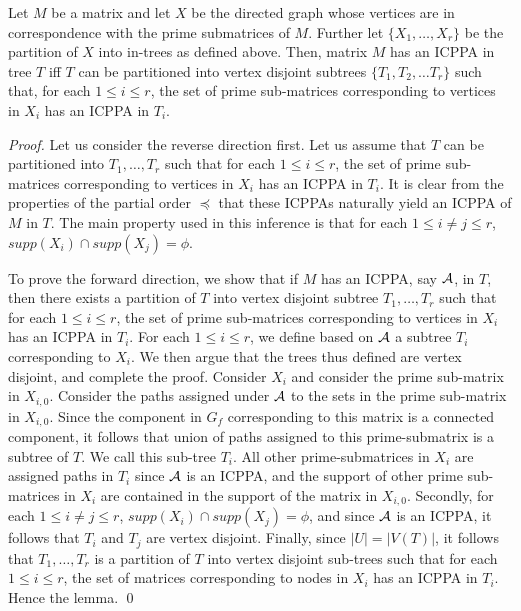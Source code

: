 \documentclass{llncs}
\def\cA{{\cal A}}
\begin{document}
\begin{lemma}
\label{lem:subicppa}
Let $M$ be a matrix and let $X$ be the directed graph whose vertices
are in correspondence with the prime submatrices of $M$.  Further let
$\{X_1,\ldots,X_r\}$ be the partition of $X$ into in-trees as defined
above. 
Then, matrix $M$ has an ICPPA in tree $T$ iff $T$ can be partitioned
into vertex disjoint subtrees 
 $\{T_1, T_2, \dots T_r\}$ such that, for each $1 \leq i \leq r$, the
 set of prime sub-matrices corresponding to vertices in $X_i$ has an
 ICPPA in $T_i$. 
\end{lemma}
\begin{proof}
Let us consider the reverse direction first.  Let us assume that $T$
can be partitioned into $T_1, \ldots, T_r$ such 
that for each $1 \leq i \leq r $, the set of prime sub-matrices
corresponding to vertices in $X_i$ has an ICPPA in $T_i$.  It is clear
from the properties of the partial order $\preccurlyeq$ that these
ICPPAs naturally yield an ICPPA  of $M$ in $T$.  The main property
used in this inference is that for each $1 \leq i \neq j \leq r$,
$supp(X_i) \cap supp(X_j) = \phi$.   

\noindent
To prove the forward direction, we show that if $M$ has an ICPPA, say
$\cA$, in $T$, then there exists 
  a partition of $T$ into vertex disjoint subtree $T_1, \ldots, T_r$
  such that for each $1 \leq i \leq r$, the set of prime sub-matrices
  corresponding to vertices in $X_i$ has an ICPPA in $T_i$.  For each
  $1 \leq i \leq r$, we define based on $\cA$ a subtree  
$T_i$ corresponding to $X_i$.  We then argue that the trees thus
defined are vertex disjoint, and complete the proof. 
 Consider $X_i$ and consider the prime sub-matrix in $X_{i,0}$.
 Consider the paths assigned under $\cA$ to the sets in the prime
 sub-matrix in $X_{i,0}$.  Since the component in $G_f$ corresponding
 to this matrix is a connected component, it follows that union of
 paths assigned to this prime-submatrix is a subtree of $T$.  We call
 this sub-tree $T_i$.  All other prime-submatrices in $X_i$ are
 assigned paths in $T_i$ since $\cA$ is an ICPPA, and the support of
 other prime sub-matrices in $X_i$ are contained in the support of the
 matrix in $X_{i,0}$.  Secondly, for each $1 \leq i \neq j \leq r$,
 $supp(X_i) \cap supp(X_j) = \phi$, and since $\cA$ is an ICPPA, it
 follows that $T_i$ and $T_j$ are vertex disjoint.  Finally, since
 $|U| = |V(T)|$, it follows that $T_1, \ldots, T_r$ is a partition of
 $T$ into vertex disjoint sub-trees such that for each $1 \leq i \leq
 r$, the set of matrices corresponding to nodes in $X_i$ has an ICPPA
 in $T_i$.  Hence the lemma. \qed
\end{proof}
\end{document}
